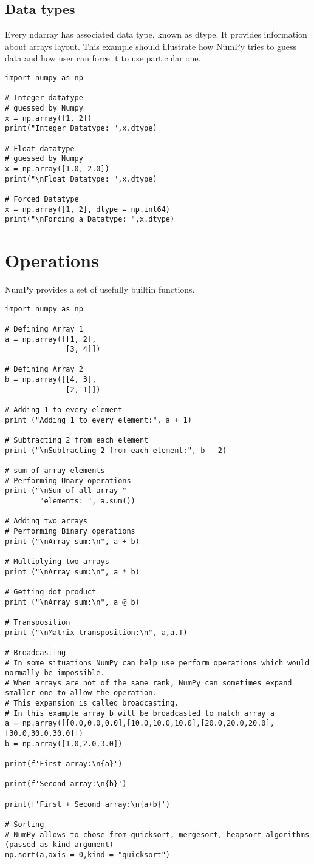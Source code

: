 \documentclass{article}
\begin{document}
\subsection{Data types}
Every ndarray has associated data type, known as dtype.
It provides information about arrays layout.
This example should illustrate how NumPy tries to guess data 
and how user can force it to use particular one.
\begin{lstlisting}
import numpy as np

# Integer datatype
# guessed by Numpy
x = np.array([1, 2])
print("Integer Datatype: ",x.dtype)

# Float datatype
# guessed by Numpy
x = np.array([1.0, 2.0])
print("\nFloat Datatype: ",x.dtype)

# Forced Datatype
x = np.array([1, 2], dtype = np.int64)
print("\nForcing a Datatype: ",x.dtype)
\end{lstlisting}
\section{Operations}
NumPy provides a set of usefully builtin functions.

\begin{lstlisting}
import numpy as np

# Defining Array 1
a = np.array([[1, 2],
              [3, 4]])
  
# Defining Array 2
b = np.array([[4, 3],
              [2, 1]])
                
# Adding 1 to every element
print ("Adding 1 to every element:", a + 1)
  
# Subtracting 2 from each element
print ("\nSubtracting 2 from each element:", b - 2)
  
# sum of array elements
# Performing Unary operations
print ("\nSum of all array "
        "elements: ", a.sum())

# Adding two arrays
# Performing Binary operations
print ("\nArray sum:\n", a + b)

# Multiplying two arrays
print ("\nArray sum:\n", a * b)

# Getting dot product
print ("\nArray sum:\n", a @ b)

# Transposition
print ("\nMatrix transposition:\n", a,a.T)

# Broadcasting
# In some situations NumPy can help use perform operations which would normally be impossible.
# When arrays are not of the same rank, NumPy can sometimes expand smaller one to allow the operation.
# This expansion is called broadcasting.
# In this example array b will be broadcasted to match array a
a = np.array([[0.0,0.0,0.0],[10.0,10.0,10.0],[20.0,20.0,20.0],[30.0,30.0,30.0]]) 
b = np.array([1.0,2.0,3.0])

print(f'First array:\n{a}')

print(f'Second array:\n{b}')

print(f'First + Second array:\n{a+b}')

# Sorting
# NumPy allows to chose from quicksort, mergesort, heapsort algorithms (passed as kind argument)
np.sort(a,axis = 0,kind = "quicksort")
\end{lstlisting}
\end{document}
